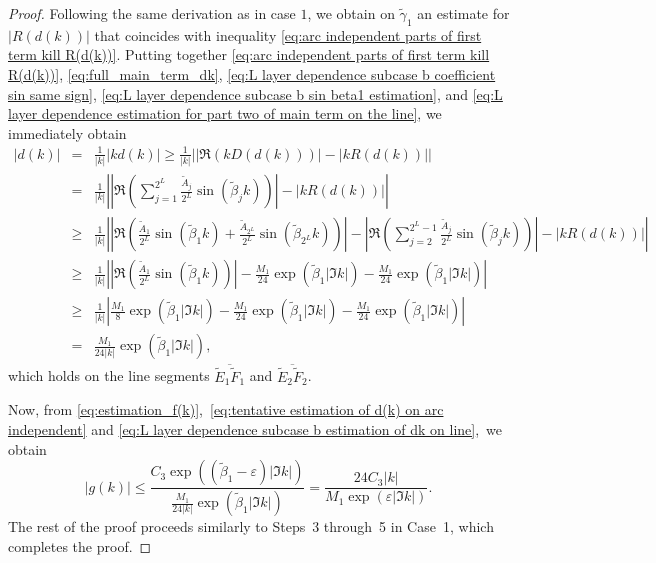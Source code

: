 \documentclass[11pt,reqno]{amsart}
\theoremstyle{definition}
\theoremstyle{remark}
\numberwithin{equation}{section}
\begin{document}
\begin{proof}
Following the same derivation as in case $1$, we obtain on $\widetilde{\gamma}_1$ an estimate for $|R(d(k))|$ that coincides with inequality \eqref{eq:arc independent parts of first term kill R(d(k))}.
Putting together \eqref{eq:arc independent parts of first term kill R(d(k))}, \eqref{eq:full_main_term_dk}, \eqref{eq:L layer dependence subcase b coefficient sin same sign}, \eqref{eq:L layer dependence subcase b sin beta1 estimation}, and \eqref{eq:L layer dependence estimation for part two of main term on the line}, we immediately obtain
\begin{eqnarray}\label{eq:L layer dependence subcase b estimation of dk on line}
      |d(k)|&=&\frac{1}{|k|}\left|kd(k)\right|\geq \frac{1}{|k|}\left| \left|\Re\left(kD(d(k))\right)\right|-\left|kR(d(k))\right| \right|  \nonumber\\
      &=&\frac{1}{|k|}\left| \left|\Re\left(\sum_{j=1}^{2^L}\frac{\tilde{A}_j}{2^L}\sin\left(\tilde{\beta}_jk\right)\right)\right|-\left|kR(d(k))\right| \right|  \nonumber \\
      &\geq& \frac{1}{|k|}\left| \left|\Re\left(\frac{\tilde{A}_1}{2^L}\sin\left(\tilde{\beta}_1k\right)+\frac{\tilde{A}_{2^L}}{2^L}\sin\left(\tilde{\beta}_{2^L}k\right)\right)\right|-\left|\Re\left(\sum_{j=2}^{2^L-1}\frac{\tilde{A}_j}{2^L}\sin\left(\tilde{\beta}_jk\right)\right)\right|-|kR(d(k))| \right| \nonumber \\
      &\geq& \frac{1}{|k|}\left| \left|\Re\left(\frac{\tilde{A}_1}{2^L}\sin\left(\tilde{\beta}_1k\right)\right)\right|-\frac{M_1}{24}\exp{\left(\tilde{\beta}_1|\Im k|\right)}-\frac{M_1}{24}\exp{\left(\tilde{\beta}_1|\Im k|\right)} \right| \nonumber \\
      &\geq& \frac{1}{|k|}\left|\frac{M_1}{8}\exp{\left(\tilde{\beta}_1|\Im k|\right)}-\frac{M_1}{24}\exp{\left(\tilde{\beta}_1|\Im k|\right)}-\frac{M_1}{24}\exp{\left(\tilde{\beta}_1|\Im k|\right)}  \right| \nonumber\\
      &=&\frac{M_1}{24|k|}\exp{\left(\tilde{\beta}_1|\Im k|\right)},~
    \end{eqnarray}
which holds on the line segments $\overline{\tilde{E}_1\tilde{F}_1}$ and $\overline{\tilde{E}_2\tilde{F}_2}$.~

Now, from \eqref{eq:estimation_f(k)},~\eqref{eq:tentative estimation of d(k) on arc independent} and \eqref{eq:L layer dependence subcase b estimation of dk on line},~we obtain
  \begin{equation*}
     |g(k)|\leq \frac{C_3\exp{\left( \left(\tilde{\beta}_1-\varepsilon\right)|\Im k| \right)}}{\frac{M_1}{24|k|}\exp{\left(\tilde{\beta}_1|\Im k|\right)}}=\frac{24C_3|k|}{M_1\exp{\left(\varepsilon |\Im k|\right)}}.~
  \end{equation*}
The rest of the proof proceeds similarly to Steps~3 through~5 in Case~1, which completes the proof.
\end{proof}
\end{document}
